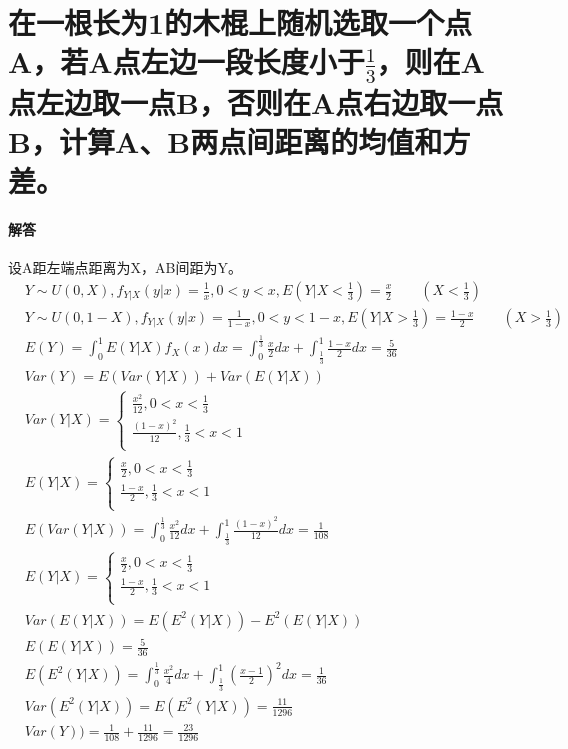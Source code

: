 \documentclass[UTF8]{ctexart}
\begin{document}
\section{在一根长为1的木棍上随机选取一个点A，若A点左边一段长度小于$\frac{1}{3}$，则在A点左边取一点B，否则在A点右边取一点B，计算A、B两点间距离的均值和方差。}
\paragraph{解答}
设A距左端点距离为X，AB间距为Y。
\begin{equation*}
\begin{aligned}
&Y\sim U(0,X),f_{Y\lvert X}(y\lvert x)=\frac{1}{x},0<y<x,E(Y\lvert X<\frac{1}{3})=\frac{x}{2}\quad\quad (X<\frac{1}{3})\\
&Y\sim U(0,1-X),f_{Y\lvert X}(y\lvert x)=\frac{1}{1-x},0<y<1-x,E(Y\lvert X>\frac{1}{3})=\frac{1-x}{2}\quad\quad (X>\frac{1}{3})\\
&E(Y)=\int_0^1E(Y\lvert X)f_X(x)dx=\int_0^{\frac{1}{3}}\frac{x}{2}dx+\int_{\frac{1}{3}}^1\frac{1-x}{2}dx=\frac{5}{36}\\
&Var(Y)=E(Var(Y\lvert X))+Var(E(Y\lvert X))\\
&Var(Y\lvert X)=\begin{cases}
\frac{x^2}{12},0<x<\frac{1}{3}\\
\frac{(1-x)^2}{12},\frac{1}{3}<x<1\\
\end{cases}
\\
&E(Y\lvert X)=\begin{cases}
\frac{x}{2},0<x<\frac{1}{3}\\
\frac{1-x}{2},\frac{1}{3}<x<1\\
\end{cases}
\\
&E(Var(Y\lvert X))=\int_0^{\frac{1}{3}}\frac{x^2}{12}dx+\int^1_{\frac{1}{3}}\frac{(1-x)^2}{12}dx=\frac{1}{108}\\
&E(Y\lvert X)=\begin{cases}
\frac{x}{2},0<x<\frac{1}{3}\\
\frac{1-x}{2},\frac{1}{3}<x<1\\
\end{cases}
\\
&Var(E(Y\lvert X))=E(E^2(Y\lvert X))-E^2(E(Y\lvert X))\\
&E(E(Y\lvert X))=\frac{5}{36}\\
&E(E^2(Y\lvert X))=\int_0^{\frac{1}{3}}\frac{x^2}{4}dx+\int_{\frac{1}{3}}^1(\frac{x-1}{2})^2dx=\frac{1}{36}\\
&Var(E^2(Y\lvert X))=E(E^2(Y\lvert X))=\frac{11}{1296}\\
&Var(Y))=\frac{1}{108}+\frac{11}{1296}=\frac{23}{1296}\\
\end{aligned}
\end{equation*}
\end{document}

